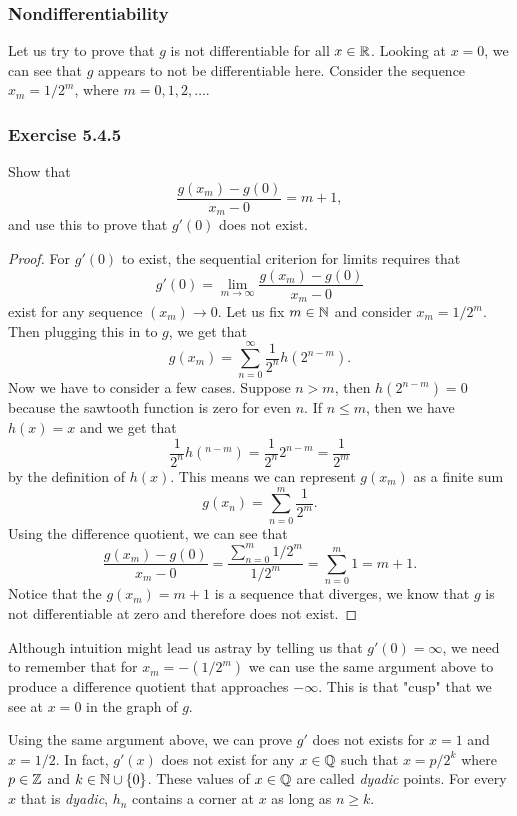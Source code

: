 \subsubsection{Nondifferentiability} 

Let us try to prove that \( g  \) is not differentiable for all \( x \in \mathbb{R}  \). Looking at \( x = 0  \), we can see that \( g  \) appears to not be differentiable here. Consider the sequence \( x_m = 1/2^m \), where \( m = 0,1,2, \dots \).

\subsubsection{Exercise 5.4.5} Show that 
\[  \frac{ g(x_m) - g(0)  }{ x_m - 0  } = m+1,  \]
and use this to prove that \( g'(0)  \) does not exist.
\begin{proof}
For \( g'(0)  \) to exist, the sequential criterion for limits requires that 
\[ g'(0) = \lim_{ m \to \infty  }  \frac{ g(x_m) - g(0)  }{ x_m - 0  }  \] exist for any sequence \( (x_m) \to 0  \). Let us fix \( m \in \mathbb{N}  \) and consider \( x_m  = 1 / 2^m \). Then plugging this in to \( g  \), we get that
\[ g(x_m) = \sum_{ n=0 }^{ \infty  } \frac{ 1 }{ 2^n  } h(2^{n-m}).\] Now we have to consider a few cases. Suppose \( n > m  \), then \( h(2^{n-m})  = 0  \) because the sawtooth function is zero for even \( n  \). If \(  n \leq m  \), then we have \( h(x) = x  \) and we get that 
\[  \frac{ 1 }{ 2^n } h(^{n-m} ) = \frac{ 1 }{ 2^n } 2^{n-m} = \frac{ 1 }{ 2^m } \]
by the definition of \( h(x)  \). This means we can represent \( g(x_m)  \) as a finite sum
\[  g(x_n) = \sum_{ n=0 }^{ m } \frac{ 1 }{ 2^m }. \] Using the difference quotient, we can see that 
\[  \frac{ g(x_m) - g(0)  }{ x_m - 0  } = \frac{ \sum_{ n=0 }^{ m } 1/2^m }{ 1/2^m } = \sum_{ n=0 }^{ m }1 = m + 1. \]
Notice that the \( g(x_m) = m + 1  \) is a sequence that diverges, we know that \( g  \) is not differentiable at zero and therefore does not exist.
\end{proof}

Although intuition might lead us astray by telling us that \( g'(0) = \infty  \), we need to remember that for \( x_m = -(1/2^m) \) we can use the same argument above to produce a difference quotient that approaches \( - \infty  \). This is that "cusp" that we see at \( x = 0  \) in the graph of \( g  \). 

Using the same argument above, we can prove \( g' \) does not exists for \( x = 1  \) and \( x = 1 / 2 \). In fact, \( g'(x)  \) does not exist for any \( x \in \mathbb{Q}  \) such that \( x = p/2^k \) where \( p \in \mathbb{Z}  \) and \( k \in \mathbb{N} \cup \{ 0 \}  \). These values of \( x \in \mathbb{Q}  \) are called \textit{dyadic} points. For every \( x  \) that is \textit{dyadic}, \( h_n  \) contains a corner at \( x  \) as long as \( n \geq k  \). 

